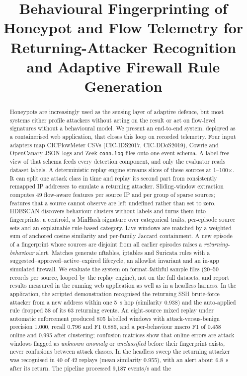 \documentclass[conference]{IEEEtran}
\begin{document}
\title{Behavioural Fingerprinting of Honeypot and Flow Telemetry for Returning-Attacker Recognition and Adaptive Firewall Rule Generation}

\author{
}

\maketitle

\begin{abstract}
Honeypots are increasingly used as the sensing layer of adaptive defence, but most systems either profile attackers without acting on the result or act on flow-level signatures without a behavioural model. We present an end-to-end system, deployed as a containerised web application, that closes this loop on recorded telemetry. Four input adapters map CICFlowMeter CSVs (CIC-IDS2017, CIC-DDoS2019), Cowrie and OpenCanary JSON logs and Zeek \texttt{conn.log} files onto one event schema. A label-free view of that schema feeds every detection component, and only the evaluator reads dataset labels. A deterministic replay engine streams slices of these sources at 1--100$\times$. It can split one attack class in time and replay its second part from consistently remapped IP addresses to emulate a returning attacker. Sliding-window extraction computes 49 flow-aware features per source IP and per group of sparse sources; features that a source cannot observe are left undefined rather than set to zero. HDBSCAN discovers behaviour clusters without labels and turns them into fingerprints: a centroid, a MinHash signature over categorical traits, per-episode source sets and an explainable rule-based category. Live windows are matched by a weighted sum of anchored cosine similarity and per-family Jaccard containment. A new episode of a fingerprint whose sources are disjoint from all earlier episodes raises a \emph{returning-behaviour} alert. Matches generate nftables, iptables and Suricata rules with a suggested--approved--active--expired lifecycle, an allowlist invariant and an in-app simulated firewall. We evaluate the system on format-faithful sample files (20--50 records per source, looped by the replay engine), not on the full datasets, and report results measured in the running web application as well as in a headless harness. In the application, the scripted demonstration recognised the returning SSH brute-force attacker from a new address within one 5~s hop (similarity 0.938) and the auto-applied rule dropped 58 of its 63 returning events. An eight-source mixed replay under automatic enforcement produced 805 labelled windows with attack-versus-benign precision 1.000, recall 0.796 and F1 0.886, and a per-behaviour macro F1 of 0.458 online and 0.995 after clustering; confusion matrices show that online errors are attack windows flagged as \emph{unknown anomaly} or \emph{unclassified} before their fingerprint exists, never confusions between attack classes. In the headless sweep the returning attacker was recognised in 40 of 42 replays (mean similarity 0.955), with an alert about 6.8~s after its return. The pipeline processed 9,187 events/s and the 
\end{abstract}
\end{document}
